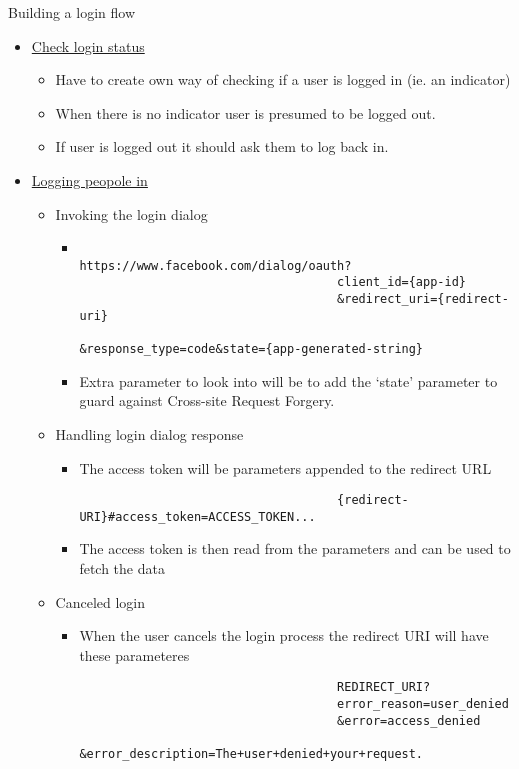 \documentclass{article}
\begin{document}
			Building a login flow
			\begin{itemize}
				\item \href{https://developers.facebook.com/docs/facebook-login/manually-build-a-login-flow#checklogin}{Check login status}
					\begin{itemize}
						\item Have to create own way of checking if a user is logged in (ie. an indicator)
						\item When there is no indicator user is presumed to be logged out.
						\item If user is logged out it should ask them to log back in.
					\end{itemize}
				\item \href{https://developers.facebook.com/docs/facebook-login/manually-build-a-login-flow#login}{Logging peopole in}
					\begin{itemize}
						\item Invoking the login dialog
							\begin{itemize}
								\item
									\begin{verbatim}
									https://www.facebook.com/dialog/oauth?
									client_id={app-id}
									&redirect_uri={redirect-uri}
									&response_type=code&state={app-generated-string}
									\end{verbatim}
								\item Extra parameter to look into will be to add the `state' parameter to guard against Cross-site Request Forgery.
							\end{itemize}
						\item Handling login dialog response
							\begin{itemize}
								\item The access token will be parameters appended to the redirect URL
								\begin{verbatim}
									{redirect-URI}#access_token=ACCESS_TOKEN...
								\end{verbatim}
								\item The access token is then read from the parameters and can be used to fetch the data
							\end{itemize}
						\item Canceled login
							\begin{itemize}
								\item When the user cancels the login process the redirect URI will have these parameteres
								\begin{verbatim}
									REDIRECT_URI?
  									error_reason=user_denied
  									&error=access_denied
  									&error_description=The+user+denied+your+request.
								\end{verbatim}
							\end{itemize}
					\end{itemize}


\end{itemize}
\end{document}
